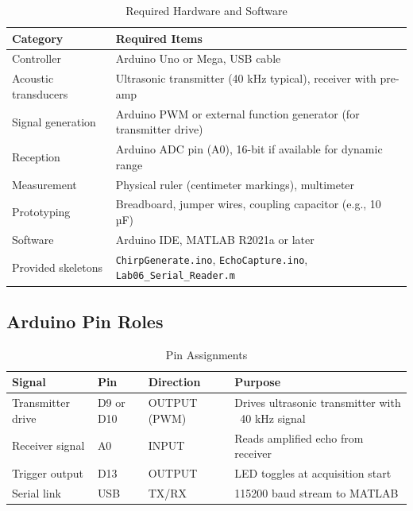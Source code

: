 \documentclass[11pt,letterpaper]{article}
\begin{document}
\begin{table}[H]
    \centering
    \caption{Required Hardware and Software}
    \label{tab:equipment}
    \begin{tabularx}{\linewidth}{l X}
    \toprule
    \textbf{Category} & \textbf{Required Items}\\
    \midrule
    Controller & Arduino Uno or Mega, USB cable\\
    Acoustic transducers & Ultrasonic transmitter (40 kHz typical), receiver with pre-amp\\
    Signal generation & Arduino PWM or external function generator (for transmitter drive)\\
    Reception & Arduino ADC pin (A0), 16-bit if available for dynamic range\\
    Measurement & Physical ruler (centimeter markings), multimeter\\
    Prototyping & Breadboard, jumper wires, coupling capacitor (e.g., 10 µF)\\
    Software & Arduino IDE, MATLAB R2021a or later\\
    Provided skeletons & \texttt{ChirpGenerate.ino}, \texttt{EchoCapture.ino}, \texttt{Lab06\_Serial\_Reader.m}\\
    \bottomrule
    \end{tabularx}
\end{table}

\subsection*{Arduino Pin Roles}

\begin{table}[H]
    \centering
    \caption{Pin Assignments}
    \label{tab:pins}
    \begin{tabularx}{\linewidth}{l l l X}
    \toprule
    \textbf{Signal} & \textbf{Pin} & \textbf{Direction} & \textbf{Purpose}\\
    \midrule
    Transmitter drive & D9 or D10 & OUTPUT (PWM) & Drives ultrasonic transmitter with ~40 kHz signal\\
    Receiver signal & A0 & INPUT & Reads amplified echo from receiver\\
    Trigger output & D13 & OUTPUT & LED toggles at acquisition start\\
    Serial link & USB & TX/RX & 115200 baud stream to MATLAB\\
    \bottomrule
    \end{tabularx}
\end{table}
\end{document}
